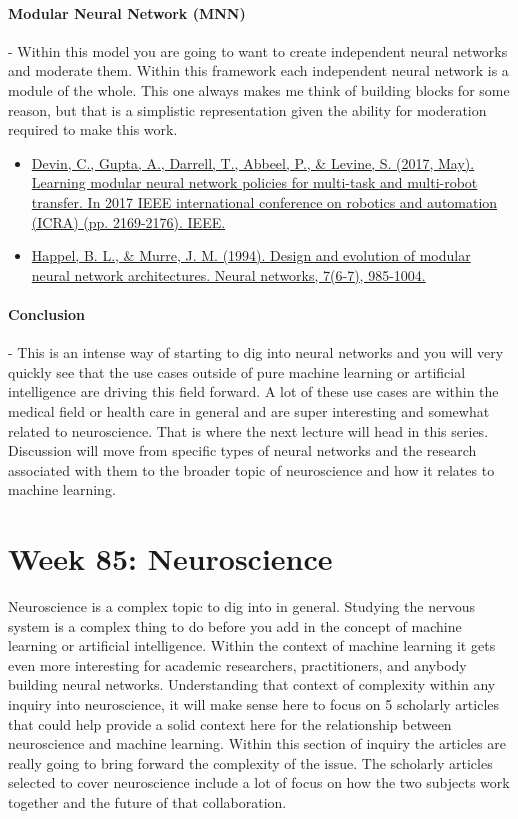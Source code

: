 \documentclass{article}
\begin{document}
\paragraph{Modular Neural Network (MNN)} - Within this model you are going to want to create independent neural networks and moderate them. Within this framework each independent neural network is a module of the whole. This one always makes me think of building blocks for some reason, but that is a simplistic representation given the ability for moderation required to make this work. 

\begin{itemize}
\item \href{https://arxiv.org/pdf/1609.07088.pdf}{Devin, C., Gupta, A., Darrell, T., Abbeel, P., \& Levine, S. (2017, May). Learning modular neural network policies for multi-task and multi-robot transfer. In 2017 IEEE international conference on robotics and automation (ICRA) (pp. 2169-2176). IEEE.} \cite{devin2017learning}
\item \href{https://citeseerx.ist.psu.edu/viewdoc/summary?doi=10.1.1.54.8248}{Happel, B. L., \& Murre, J. M. (1994). Design and evolution of modular neural network architectures. Neural networks, 7(6-7), 985-1004.} \cite{happel1994design}
\end{itemize}

\paragraph{Conclusion} - This is an intense way of starting to dig into neural networks and you will very quickly see that the use cases outside of pure machine learning or artificial intelligence are driving this field forward. A lot of these use cases are within the medical field or health care in general and are super interesting and somewhat related to neuroscience. That is where the next lecture will head in this series. Discussion will move from specific types of neural networks and the research associated with them to the broader topic of neuroscience and how it relates to machine learning. 

\section{Week 85: Neuroscience}
Neuroscience is a complex topic to dig into in general. Studying the nervous system is a complex thing to do before you add in the concept of machine learning or artificial intelligence. Within the context of machine learning it gets even more interesting for academic researchers, practitioners, and anybody building neural networks. Understanding that context of complexity within any inquiry into neuroscience, it will make sense here to focus on 5 scholarly articles that could help provide a solid context here for the relationship between neuroscience and machine learning. Within this section of inquiry the articles are really going to bring forward the complexity of the issue. The scholarly articles selected to cover neuroscience include a lot of focus on how the two subjects work together and the future of that collaboration.  
\end{document}
